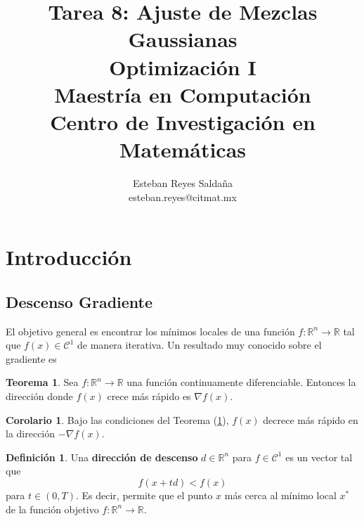 \documentclass[11pt,letterpaper]{article}
\title{\textbf{Tarea 8: Ajuste de Mezclas Gaussianas}\\ Optimización I \\ \Large {Maestría en Computación}\\ \Large {Centro de Investigación en Matemáticas}}
\author{Esteban Reyes Saldaña \\ esteban.reyes@citmat.mx}
\theoremstyle{definition}
\newtheorem{defi}{Definición}[section]%
\theoremstyle{definition}
\newtheorem{teo}{Teorema}[section]%
\theoremstyle{definition}
\newtheorem{col}{Corolario}[section]
\begin{document}

\section{Introducción}
\subsection{Descenso Gradiente}
El objetivo general es encontrar los mínimos locales de una función $ f : \mathbb{R}^n \to \mathbb{R} $ tal que $ f(x) \in\mathcal{C}^1 $ de manera iterativa.
Un resultado muy conocido sobre el gradiente es
\begin{shaded*}
	\begin{teo}\label{max_}
		Sea $ f: \mathbb{R}^n \to \mathbb{R} $ una función continuamente diferenciable. Entonces la dirección donde $ f(x) $ crece más rápido es $ \nabla f(x) $.
	\end{teo}
\end{shaded*}

\begin{col}
	Bajo las condiciones del Teorema (\ref{max_}), $ f(x) $ decrece más rápido en la dirección $ - \nabla f(x) $.
\end{col}

\begin{shaded*}
	\begin{defi}
		Una \textbf{dirección de descenso} $ d \in \mathbb{R}^n $ para $ f \in \mathcal{C}^1 $ es un vector tal que
		\[ f(x + t d) < f(x) \]
		para $ t \in (0, T) $. Es decir, permite que el punto $ x $ más cerca al mínimo local $ x^* $ de la función objetivo $ f: \mathbb{R}^n \to \mathbb{R} $.
	\end{defi}
\end{shaded*}
\end{document}
